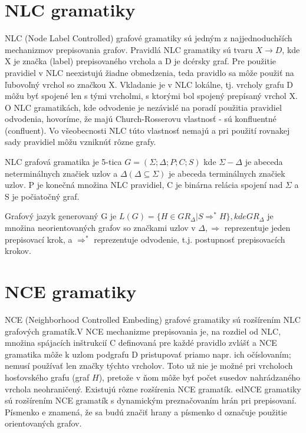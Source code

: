 \section{NLC gramatiky}
NLC (Node Label Controlled) grafové gramatiky sú jedným 
z najjednoduchších mechanizmov prepisovania grafov. Pravidlá NLC gramatiky 
sú tvaru $X \to D$, kde X je značka (label) prepisovaného vrchola a D je 
dcérsky graf. Pre použitie pravidiel v NLC neexistujú žiadne obmedzenia, teda 
pravidlo sa môže použiť na ľubovoľný vrchol so značkou X.
Vkladanie je v NLC lokálne, tj. vrcholy grafu D môžu byť spojené len s tými 
vrcholmi, s ktorými bol spojený prepísaný vrchol X.
O NLC gramatikách, kde odvodenie je nezávislé na poradí použitia pravidiel 
odvodenia, hovoríme, že majú Church-Rosserovu vlastnosť 
- sú konfluentné (confluent). 
Vo všeobecnosti NLC túto vlastnosť nemajú a pri použití rovnakej sady 
pravidiel môžu vzniknúť rôzne grafy. 

\begin{defin}
NLC grafová gramatika je 5-tica $G = (\Sigma ;\Delta ; P;C; S)$ kde
$\Sigma  - \Delta$  je abeceda neterminálnych značiek uzlov a
 $\Delta  (\Delta  \subseteq  \Sigma )$ je abeceda
terminálnych značiek uzlov. P je konečná množina NLC pravidiel, C je
binárna relácia spojení nad $\Sigma$  a S je počiatočný graf.
\end{defin}

\begin{defin}
Grafový jazyk generovaný G je $L(G) = \{H \in GR_\Delta  | S \Rightarrow ^*H\}
, kde GR_\Delta $  je množina neorientovaných grafov so značkami uzlov 
v $\Delta ,\Rightarrow $  reprezentuje jeden prepisovací krok, 
a $\Rightarrow ^* $ reprezentuje odvodenie, t.j. postupnosť prepisovacích 
krokov.
\end{defin}

\section{NCE gramatiky}
NCE (Neighborhood Controlled Embeding) grafové gramatiky sú rozšírením NLC 
grafových gramatík.V NCE mechanizme prepisovania je, 
na rozdiel od NLC, množina spájacích inštrukcií C definovaná 
pre každé pravidlo zvlášť a NCE gramatika môže k uzlom podgrafu D 
pristupovať priamo napr. ich očíslovaním; nemusí používať len značky týchto
vrcholov. Toto už nie je možné pri vrcholoch hosťovského grafu (graf $H$),
pretože v ňom môže byť počet susedov nahrádzaného vrchola neohraničený.
Existujú rôzne rozšírenia NCE gramatík.
edNCE gramatiky sú rozšírením NCE gramatík s dynamickým 
preznačovaním hrán pri prepisovaní. 
Písmenko e znamená, že sa  budú značiť hrany a písmenko d označuje 
použitie orientovaných grafov.

